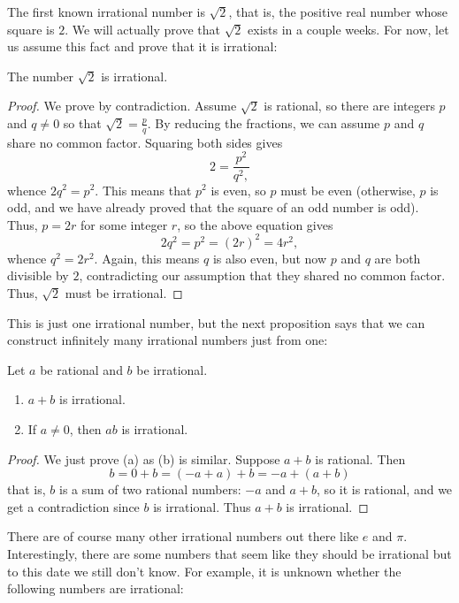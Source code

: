 \documentclass[11pt,dvipsnames]{book}
\numberwithin{figure}{section} %
\numberwithin{table}{section} %
\begin{document}
The first known irrational number is $\sqrt{2}$, that is, the positive real number whose square is $2$. We will actually prove that $\sqrt{2}$ exists in a couple weeks. For now, let us assume this fact and prove that it is irrational:
\begin{theorem}
The number $\sqrt{2}$ is irrational.
\end{theorem}

\begin{proof}
We prove by contradiction. Assume $\sqrt{2}$ is rational, so there are integers $p$ and $q\neq 0$ so that $\sqrt{2}=\frac{p}{q}$. By reducing the fractions, we can assume $p$ and $q$ share no common factor. Squaring both sides gives
\[
2=\frac{p^{2}}{q^2,}
\]
whence $2q^2=p^2$.
This means that $p^2$ is even, so $p$ must be even (otherwise, $p$ is odd, and we have already proved that the square of an odd number is odd). Thus, $p=2r$ for some integer $r$, so the above equation gives
\[
2q^2=p^2=(2r)^2=4r^2,
\]
whence $ q^2=2r^2$.
Again, this means $q$ is also even, but now $p$ and $q$ are both divisible by $2$, contradicting our assumption that they shared no common factor. Thus, $\sqrt{2}$ must be irrational.
\end{proof}

This is just one irrational number, but the next proposition says that we can construct infinitely many irrational numbers just from one:

\begin{proposition}
Let $a$ be rational and $b$ be irrational.
\begin{enumerate}[label=(\alph*)]
\item $a+b$ is irrational.
\item If $a\neq 0$, then $ab$ is irrational.
\end{enumerate}
\end{proposition}

\begin{proof}
We just prove (a) as (b) is similar. Suppose $a+b$ is rational. Then
\[
b=0+b=(-a+a)+b=-a+(a+b)
\]
that is, $b$ is a sum of two rational numbers: $-a$ and $a+b$, so it is rational, and we get a contradiction since $b$ is irrational. Thus $a+b$ is irrational.
\end{proof}

There are of course many other irrational numbers out there like $e$ and $\pi$. Interestingly, there are some numbers that seem like they should be irrational but to this date we still don't know. For example, it is unknown whether the following numbers are irrational:
\end{document}
